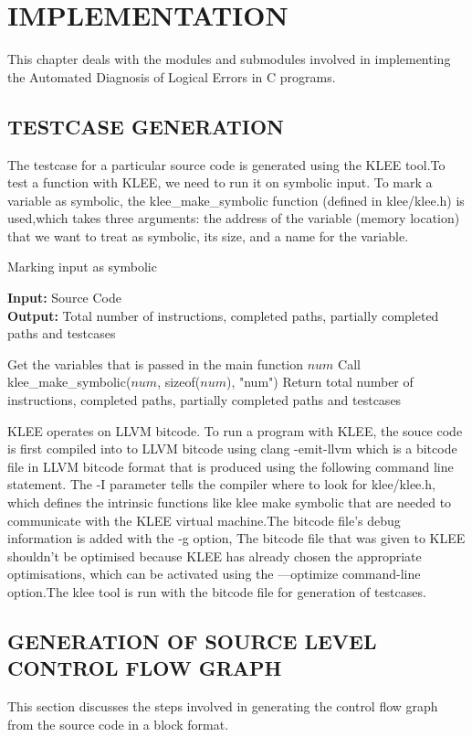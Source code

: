 
\chapter{\uppercase{Implementation }} %
\label{chap4} %
This chapter deals with the modules and submodules involved in implementing the Automated Diagnosis of Logical Errors in C programs.
\section{\uppercase{Testcase Generation}}
The testcase for a particular source code is generated using the KLEE tool.To test a function with KLEE, we need to run it on symbolic input. To mark a variable as symbolic, the klee\_make\_symbolic function (defined in klee/klee.h) is used,which takes three arguments: the address of the variable (memory location) that we want to treat as symbolic, its size, and a name for the variable.
\begin{algorithm}
\caption{Marking input as symbolic}\label{alg:cap}
\textbf{Input:} Source Code\\
\textbf{Output:} Total number of instructions, completed paths, partially completed paths and testcases
\begin{algorithmic}[1]
\State Get the variables that is passed in the main function $num$
\State Call klee\_make\_symbolic($num$, sizeof($num$), "num")
\State Return total number of instructions, completed paths, partially completed paths and testcases
\end{algorithmic}
\end{algorithm}
KLEE operates on LLVM bitcode. To run a program with KLEE, the souce code is first compiled into to LLVM bitcode using clang -emit-llvm which is a bitcode file in LLVM bitcode format that is produced using the following command line statement. The -I parameter tells the compiler where to look for klee/klee.h, which defines the intrinsic functions like klee make symbolic that are needed to communicate with the KLEE virtual machine.The bitcode file's debug information is added with the -g option, The bitcode file that was given to KLEE shouldn't be optimised because KLEE has already chosen the appropriate optimisations, which can be activated using the —optimize command-line option.The klee tool is run with the bitcode file for generation of testcases.


\section{\uppercase{Generation of Source Level Control Flow Graph}}
This section discusses the steps involved in generating the control flow graph from the source code in a block format.

